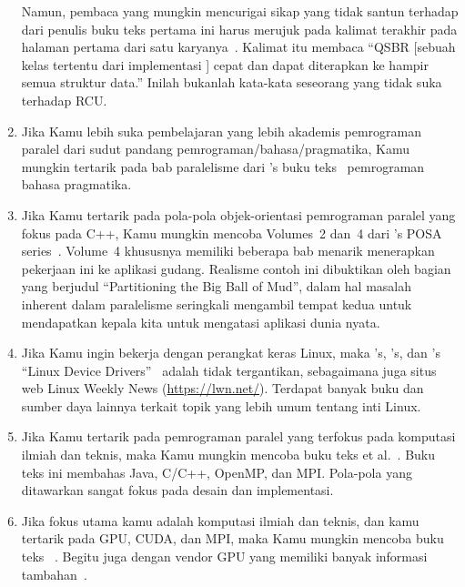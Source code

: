 \begin{enumerate}
	Namun, pembaca yang mungkin mencurigai sikap yang tidak
	santun terhadap  dari penulis buku teks pertama ini
	harus merujuk pada kalimat terakhir pada halaman pertama dari
	satu karyanya~\cite{Balmau:2016:FRM:2935764.2935790}.
	Kalimat itu membaca ``QSBR [sebuah kelas tertentu dari
	implementasi ] cepat dan dapat diterapkan ke hampir
	semua struktur data.''
	Inilah bukanlah kata-kata seseorang yang tidak suka
	terhadap RCU.
\item	Jika Kamu lebih suka pembelajaran yang lebih akademis 
	pemrograman paralel dari sudut pandang pemrograman\-/bahasa\-/pragmatika,
	Kamu mungkin tertarik pada bab paralelisme dari
	's
	buku teks~\cite{MichaelScott2006Textbook,MichaelScott2015Textbook}
	pemrograman bahasa pragmatika.
\item	Jika Kamu tertarik pada pola-pola objek-orientasi
	pemrograman paralel yang fokus pada C++,
	Kamu mungkin mencoba Volumes~2 dan~4 dari 's POSA
	series~\cite{SchmidtStalRohnertBuschmann2000v2Textbook,
	BuschmannHenneySchmidt2007v4Textbook}.
	Volume~4 khususnya memiliki beberapa bab menarik
	menerapkan pekerjaan ini ke aplikasi gudang.
	Realisme contoh ini dibuktikan oleh
	bagian yang berjudul ``Partitioning the Big Ball of Mud'',
	dalam hal masalah inherent dalam paralelisme seringkali
	mengambil tempat kedua untuk mendapatkan kepala kita
	untuk mengatasi aplikasi dunia nyata.
\item	Jika Kamu ingin bekerja dengan perangkat keras Linux,
	maka 's, 's,
	dan 's
	``Linux Device Drivers''~\cite{CorbetRubiniKroahHartman}
	adalah tidak tergantikan, sebagaimana juga situs web Linux Weekly News
	(\url{https://lwn.net/}).
	Terdapat banyak buku dan sumber daya lainnya
	terkait topik yang lebih umum tentang inti Linux.
\item	Jika Kamu tertarik pada pemrograman paralel yang
	terfokus pada komputasi ilmiah dan teknis,
	maka Kamu mungkin mencoba buku teks  et al.~\cite{Mattson2005Textbook}.
	Buku teks ini membahas Java, C/C++, OpenMP, dan MPI\@.
	Pola-pola yang ditawarkan sangat fokus pada desain
	dan implementasi.
\item	Jika fokus utama kamu adalah komputasi ilmiah dan teknis,
	dan kamu tertarik pada GPU, CUDA, dan MPI,
	maka Kamu mungkin mencoba buku teks ~\cite{NormMatloff2017ParProcBook}.
	Begitu juga dengan vendor GPU yang
	memiliki banyak informasi tambahan~\cite{AMD2020ROCm,CyrilZeller2011GPGPUbasics,NVidia2017GPGPU,NVidia2017GPGPU-university}.

\end{enumerate}
